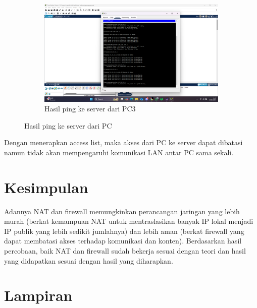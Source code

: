 \begin{figure}[H]
\begin{subfigure}[b]{0.4\linewidth}
		\centering
		\includegraphics[width=\linewidth]{P4/img/tumod (12).png}
		\caption{Hasil ping ke server dari PC3\label{fig:konfigurasiR2}}
	\end{subfigure}
	\caption{Hasil ping ke server dari PC}
	\hspace{1cm}
\end{figure}
Dengan menerapkan access list, maka akses dari PC ke server dapat dibatasi namun tidak akan mempengaruhi komunikasi LAN antar PC sama sekali.
\section{Kesimpulan}
Adannya NAT dan firewall memungkinkan perancangan jaringan yang lebih murah (berkat kemampuan NAT untuk mentraslasikan banyak IP lokal menjadi IP publik yang lebih sedikit jumlahnya) dan lebih aman (berkat firewall yang dapat membatasi akses terhadap komunikasi dan konten). Berdasarkan hasil percobaan, baik NAT dan firewall sudah bekerja sesuai dengan teori dan hasil yang didapatkan sesuai dengan hasil yang diharapkan.

\section{Lampiran}
